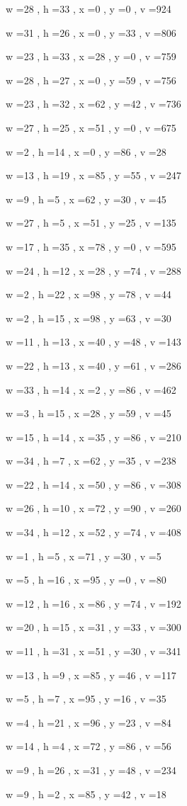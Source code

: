 \documentclass[11pt]{article}
\begin{document}
w =28 , h =33 , x =0 , y =0 , v =924
\par
w =31 , h =26 , x =0 , y =33 , v =806
\par
w =23 , h =33 , x =28 , y =0 , v =759
\par
w =28 , h =27 , x =0 , y =59 , v =756
\par
w =23 , h =32 , x =62 , y =42 , v =736
\par
w =27 , h =25 , x =51 , y =0 , v =675
\par
w =2 , h =14 , x =0 , y =86 , v =28
\par
w =13 , h =19 , x =85 , y =55 , v =247
\par
w =9 , h =5 , x =62 , y =30 , v =45
\par
w =27 , h =5 , x =51 , y =25 , v =135
\par
w =17 , h =35 , x =78 , y =0 , v =595
\par
w =24 , h =12 , x =28 , y =74 , v =288
\par
w =2 , h =22 , x =98 , y =78 , v =44
\par
w =2 , h =15 , x =98 , y =63 , v =30
\par
w =11 , h =13 , x =40 , y =48 , v =143
\par
w =22 , h =13 , x =40 , y =61 , v =286
\par
w =33 , h =14 , x =2 , y =86 , v =462
\par
w =3 , h =15 , x =28 , y =59 , v =45
\par
w =15 , h =14 , x =35 , y =86 , v =210
\par
w =34 , h =7 , x =62 , y =35 , v =238
\par
w =22 , h =14 , x =50 , y =86 , v =308
\par
w =26 , h =10 , x =72 , y =90 , v =260
\par
w =34 , h =12 , x =52 , y =74 , v =408
\par
w =1 , h =5 , x =71 , y =30 , v =5
\par
w =5 , h =16 , x =95 , y =0 , v =80
\par
w =12 , h =16 , x =86 , y =74 , v =192
\par
w =20 , h =15 , x =31 , y =33 , v =300
\par
w =11 , h =31 , x =51 , y =30 , v =341
\par
w =13 , h =9 , x =85 , y =46 , v =117
\par
w =5 , h =7 , x =95 , y =16 , v =35
\par
w =4 , h =21 , x =96 , y =23 , v =84
\par
w =14 , h =4 , x =72 , y =86 , v =56
\par
w =9 , h =26 , x =31 , y =48 , v =234
\par
w =9 , h =2 , x =85 , y =42 , v =18
\par
\newpage
\end{document}
